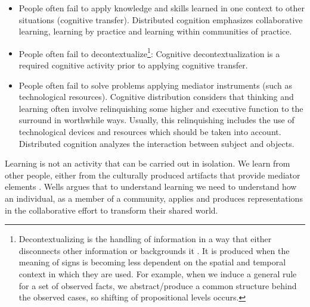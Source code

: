 \documentclass[10pt,twocolumn,ieeetran]{article}
\begin{document}
\begin{itemize}

\item People often fail to apply knowledge and skills learned in one context to other situations \cite{Perkins} (cognitive transfer). Distributed cognition emphasizes collaborative learning, learning by practice and learning within communities of practice.

\item People often fail to decontextualize\footnote{Decontextualizing \cite{Wertsch} is the handling of information in a way that either disconnects other information or backgrounds it \cite{Denny}. It is produced when the meaning of  signs is becoming less dependent on the spatial and temporal context in which they are used. For example, when we induce a general rule for a set of observed facts, we abstract/produce a common structure behind the observed cases, so shifting of propositional levels occurs.}: Cognitive decontextualization is a required cognitive activity prior to applying cognitive transfer.  

\item People often fail to solve problems applying mediator instruments (such as technological resources).
Cognitive distribution considers that thinking and learning often involve relinquishing some higher and executive function to the surround in worthwhile ways. Usually, this relinquishing includes the use of technological devices and resources which should be taken into account. Distributed cognition analyzes the interaction between subject and objects.   
\end{itemize}









Learning is not an activity that can be carried out in isolation. We learn from other people, either from the culturally produced artifacts that provide mediator elements \cite{Wells}. Wells \cite{Wells}  argues that to understand learning we need to understand how an individual, as a member of a community, applies and produces representations in the collaborative effort to transform their shared world.

\end{document}
